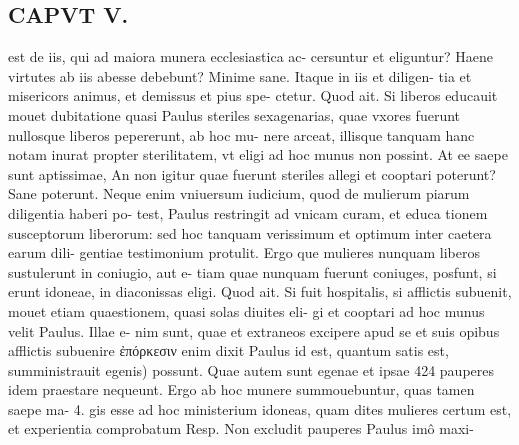 \documentclass{article}
\begin{document}
\begin{pages}
\section*{CAPVT  V. }
\marginpar{[ p.279 ]}\pstart est de iis, qui ad maiora munera ecclesiastica ac- cersuntur et eliguntur? Haene virtutes ab iis abesse debebunt? Minime sane. Itaque in iis et diligen- tia et misericors animus, et demissus et pius spe- ctetur. Quod ait. Si liberos educauit mouet dubitatione quasi Paulus steriles sexagenarias, quae vxores fuerunt nullosque liberos pepererunt, ab hoc mu- nere arceat, illisque tanquam hanc notam inurat propter sterilitatem, vt eligi ad hoc munus non possint. At ee saepe sunt aptissimae, An non igitur quae fuerunt steriles allegi et cooptari poterunt? Sane poterunt. Neque enim vniuersum iudicium, quod de mulierum piarum diligentia haberi po- test, Paulus restringit ad vnicam curam, et educa tionem susceptorum liberorum: sed hoc tanquam verissimum et optimum inter caetera earum dili- gentiae testimonium protulit. Ergo que mulieres nunquam liberos sustulerunt in coniugio, aut e- tiam quae nunquam fuerunt coniuges, posfunt, si erunt idoneae, in diaconissas eligi.  Quod ait. Si fuit hospitalis, si afflictis subuenit, mouet etiam quaestionem, quasi solas diuites eli- gi et cooptari ad hoc munus velit Paulus. Illae e- nim sunt, quae et extraneos excipere apud se et suis opibus afflictis subuenire ἐπόρκεσιν enim dixit Paulus id est, quantum satis est, sumministrauit egenis) possunt. Quae autem sunt egenae et ipsae 424 pauperes idem praestare nequeunt. Ergo ab hoc munere summouebuntur, quas tamen saepe ma- 4. gis esse ad hoc ministerium idoneas, quam dites mulieres certum est, et experientia comprobatum Resp. Non excludit pauperes Paulus imô maxi-  \pend

\end{pages}
\end{document}

